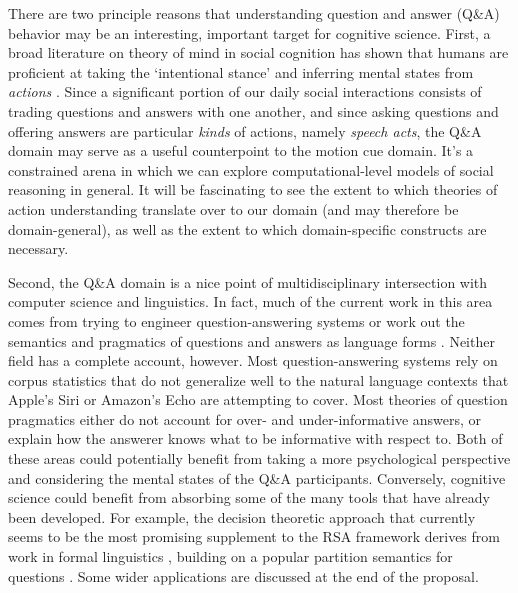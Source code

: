\documentclass[12pt]{amsart}
\begin{document}
There are two principle reasons that understanding question and answer (Q\&A) behavior may be an interesting, important target for cognitive science. First, a broad literature on theory of mind in social cognition has shown that humans are proficient at taking the `intentional stance' \cite{Dennett89_IntentionalStance} and inferring mental states from \emph{actions} \cite{BarrettToddMillerBlythe05_IntentionFromMotionCues, BakerSaxeTenenbaum09_ActionUnderstandingInversePlanning}. Since a significant portion of our daily social interactions consists of trading questions and answers with one another, and since asking questions and offering answers are particular \emph{kinds} of actions, namely \emph{speech acts}, the Q\&A domain may serve as a useful counterpoint to the motion cue domain. It's a constrained arena in which we can explore computational-level models of social reasoning in general. It will be fascinating to see the extent to which theories of action understanding  translate over to our domain (and may therefore be domain-general), as well as the extent to which domain-specific constructs are necessary. 

Second, the Q\&A domain is a nice point of multidisciplinary intersection with computer science and linguistics. In fact, much of the current work in this area comes from trying to engineer question-answering systems \cite{Simmons70_QASystems, FerrucciBrown___Welty10_Watson}  or work out the semantics and pragmatics of questions and answers as language forms \cite{GroenendijkStokhof84_SemanticsOfQuestions, VanRooy03_QuestioningDecisionProblems}. Neither field has a complete account, however. Most question-answering systems rely on corpus statistics that do not generalize well to the natural language contexts that Apple's Siri or Amazon's Echo are attempting to cover. Most theories of question pragmatics either do not account for over- and under-informative answers, or explain how the answerer knows what to be informative with respect to. Both of these areas could potentially benefit from taking a more psychological perspective and considering the mental states of the Q\&A participants. Conversely, cognitive science could benefit from absorbing some of the many tools that have already been developed. For example, the decision theoretic approach that currently seems to be the most promising supplement to the RSA framework derives from work in formal linguistics \cite{VanRooy03_QuestioningDecisionProblems}, building on a popular partition semantics for questions \cite{GroenendijkStokhof84_SemanticsOfQuestions, Groenendijk99_LogicOfInterrogation}. Some wider applications are discussed at the end of the proposal. 
\end{document}
